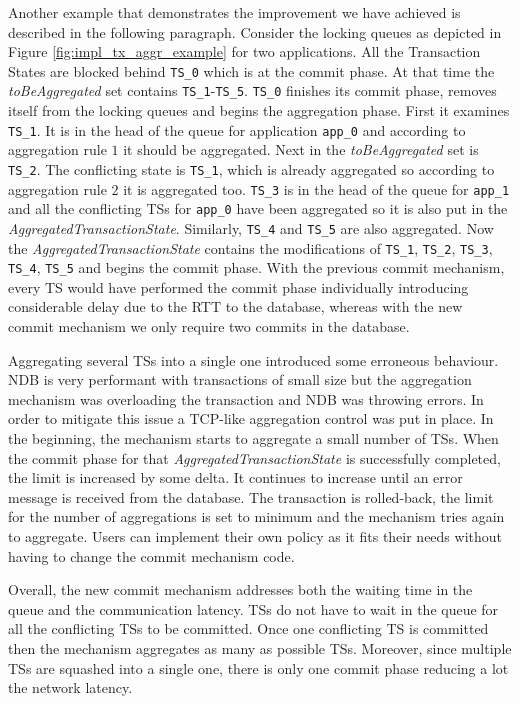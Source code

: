 Another example that demonstrates the improvement we have achieved is
described in the following paragraph. Consider the locking queues as
depicted in Figure \ref{fig:impl_tx_aggr_example} for two applications. All the Transaction
States are blocked behind \texttt{TS\_0} which is at the commit
phase. At that time the \emph{toBeAggregated} set contains
\texttt{TS\_1}-\texttt{TS\_5}. \texttt{TS\_0} finishes its commit phase, removes
itself from the locking queues and begins the aggregation phase. First
it examines \texttt{TS\_1}. It is in the head of the queue for
application \texttt{app\_0} and according to aggregation rule $1$ it
should be aggregated. Next in the \emph{toBeAggregated} set is
\texttt{TS\_2}. The conflicting state is \texttt{TS\_1}, which is
already aggregated so according to aggregation rule $2$ it is
aggregated too. \texttt{TS\_3} is in the head of the queue for
\texttt{app\_1} and all the conflicting TSs for \texttt{app\_0} have
been aggregated so it is also put in the
\emph{AggregatedTransactionState}. Similarly, \texttt{TS\_4} and
\texttt{TS\_5} are also aggregated. Now the
\emph{AggregatedTransactionState} contains the modifications of
\texttt{TS\_1}, \texttt{TS\_2}, \texttt{TS\_3}, \texttt{TS\_4},
\texttt{TS\_5} and begins the commit phase. With the previous commit
mechanism, every TS would have performed the commit phase individually introducing
considerable delay due to the RTT to the database, whereas with the
new commit mechanism we only require two commits in the database.

Aggregating several TSs into a single one introduced some erroneous
behaviour. NDB is very performant with transactions of small size but
the aggregation mechanism was overloading the transaction and NDB was
throwing errors. In order to mitigate this issue a TCP-like aggregation control
was put in place. In the beginning, the mechanism starts to aggregate
a small number of TSs. When the commit phase for that
\emph{AggregatedTransactionState} is successfully completed, the limit
is increased by some delta. It continues to increase until an error
message is received from the database. The transaction is rolled-back,
the limit for the number of aggregations is set to minimum and the
mechanism tries again to aggregate. Users can implement their own
policy as it fits their needs without having to change the commit
mechanism code.

Overall, the new commit mechanism addresses both the waiting time in
the queue and the communication latency. TSs do not have to wait in
the queue for all the conflicting TSs to be committed. Once one
conflicting TS is committed then the mechanism aggregates as many as
possible TSs. Moreover, since multiple TSs are squashed into a single
one, there is only one commit phase reducing a lot the network latency.
